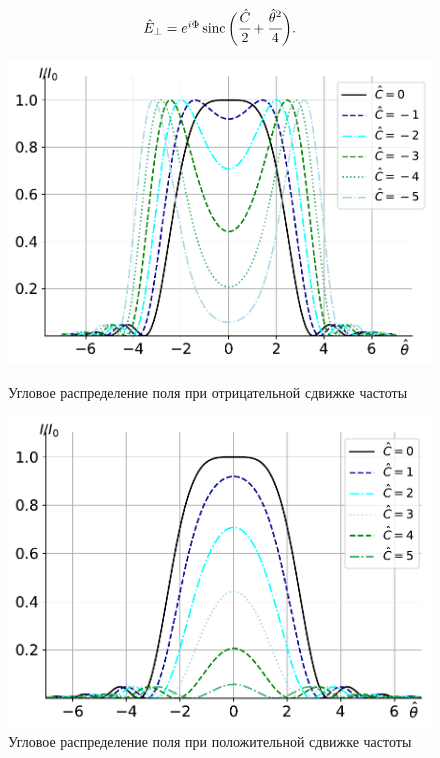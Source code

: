 \begin{equation}
	\label{eq:field_dist_Norm}
	\begin{array}{lcl}
		\hat{E}_{\bot} = e^{i\Phi}
		\operatorname{sinc}\bigg(\cfrac{\hat{C}}{2} + 
		\cfrac{\hat{\theta}^2}{4}\bigg).
	\end{array}	
\end{equation}

\begin{figure}
	\centering  
	\begin{minipage}{0.49\textwidth}
		\centering
		\includegraphics[width=\textwidth]{pic/angleC_neg.pdf}
		\caption{Угловое распределение поля при отрицательной сдвижке частоты}
		\label{fig:angle_dist_C_neg}
	\end{minipage}\hfill
	\begin{minipage}{0.49\textwidth}
		\centering
		\includegraphics[width=\textwidth]{pic/angleC_pos.pdf}
		\caption{Угловое распределение поля при положительной сдвижке частоты}
		\label{fig:angle_dist_C_pos}
	\end{minipage}    
\end{figure}
